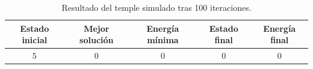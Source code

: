 \begin{table}[H]
\centering
\small
\setlength{\tabcolsep}{6pt}
\renewcommand{\arraystretch}{1.15}
\begin{tabular}{|c|c|c|c|c|}
\hline
\rowcolor{encabezado}\textbf{Estado inicial} & \textbf{Mejor solución} & \textbf{Energía mínima} & \textbf{Estado final} & \textbf{Energía final} \\
\hline
$5$ & $0$ & $0$ & $0$ & $0$ \\
\hline
\end{tabular}
\caption{Resultado del temple simulado tras 100 iteraciones.}
\label{tab:p3b-resumen}
\end{table}
